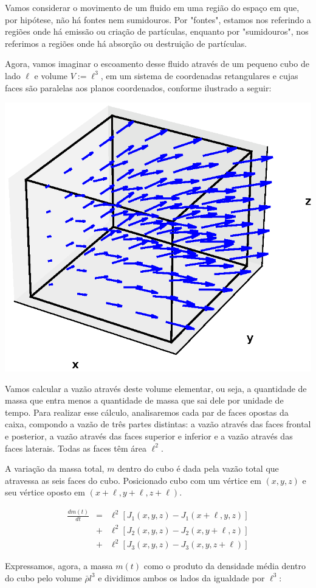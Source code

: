 Vamos considerar o movimento de um fluido em uma região do espaço em que, por hipótese, não há fontes nem sumidouros. Por "fontes", estamos nos referindo a regiões onde há emissão ou criação de partículas, enquanto por "sumidouros", nos referimos a regiões onde há absorção ou destruição de partículas.

Agora, vamos imaginar o escoamento desse fluido através de um pequeno cubo de lado $\ell$ e volume $V := \ell^3$, em um sistema de coordenadas retangulares e cujas faces são paralelas aos planos coordenados, conforme ilustrado a seguir:

\begin{center}\includegraphics[width=.5\textwidth]{cap_campos/figs/campo_com_cubo_divergente}\end{center}

Vamos calcular a vazão através deste volume elementar, ou seja, a quantidade de massa que entra menos a quantidade de massa que sai dele por unidade de tempo. Para realizar esse cálculo, analisaremos cada par de faces opostas da caixa, compondo a vazão de três partes distintas: a vazão através das faces frontal e posterior, a vazão através das faces superior e inferior e a vazão através das faces laterais. Todas as faces têm área $\ell^2$.

A variação da massa total, $m$ dentro do cubo é dada pela vazão total que atravessa as seis faces do cubo. Posicionado cubo com um vértice em $(x,y,z)$ e seu vértice oposto em $(x+\ell, y+\ell, z+\ell)$.

\begin{eqnarray*}
  \frac{d m(t)}{dt} &=&\ell^2 \left[J_1(x, y, z)-J_1(x+\ell, y, z)\right] \\
  &+& \ell^2 \left[J_2(x, y, z)-J_2(x, y+\ell, z)\right]\\
  &+& \ell^2 \left[J_3(x, y, z)-J_3(x, y, z+\ell)\right]
\end{eqnarray*}
  
Expressamos, agora, a massa $m(t)$ como o produto da densidade média dentro do cubo pelo volume $\bar{\rho} l^3$ e dividimos ambos os lados da igualdade por $\ell^3$:

